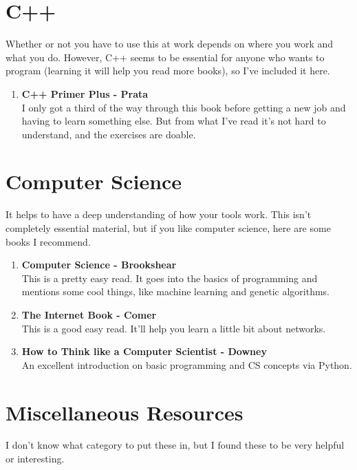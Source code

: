\documentclass[oneside, titlepage]{article}
\begin{document}
\section{C++}
Whether or not you have to use this at work depends on where you work and what you do. However, C++ seems to be essential for anyone who wants to program (learning it will help you read more books), so I've included it here.

\begin{enumerate}
\item{\bfseries C++ Primer Plus - Prata}\\
I only got a third of the way through this book before getting a new job and having to learn something else. But from what I've read it's not hard to understand, and the exercises are doable.
\end{enumerate}

\section{Computer Science}
It helps to have a deep understanding of how your tools work. This isn't completely essential material, but if you like computer science, here are some books I recommend.

\begin{enumerate}
\item{\bfseries Computer Science - Brookshear}\\
This is a pretty easy read. It goes into the basics of programming and mentions some cool things, like machine learning and genetic algorithms.

\item{\bfseries The Internet Book - Comer}\\
This is a good easy read. It'll help you learn a little bit about networks.

\item{\bfseries How to Think like a Computer Scientist - Downey}\\
An excellent introduction on basic programming and CS concepts via Python.
\end{enumerate}

\section{Miscellaneous Resources}
I don't know what category to put these in, but I found these to be very helpful or interesting.
\end{document}
